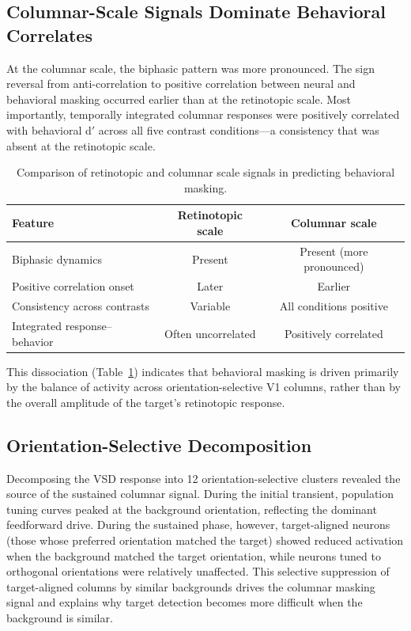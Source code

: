 \documentclass[11pt]{article}
\begin{document}
\subsection{Columnar-Scale Signals Dominate Behavioral Correlates}

At the columnar scale, the biphasic pattern was more pronounced. The sign reversal from anti-correlation to positive correlation between neural and behavioral masking occurred earlier than at the retinotopic scale. Most importantly, temporally integrated columnar responses were positively correlated with behavioral d$'$ across all five contrast conditions---a consistency that was absent at the retinotopic scale.

\begin{table}[ht]
\centering
\caption{Comparison of retinotopic and columnar scale signals in predicting behavioral masking.}
\label{tab:scales}
\begin{tabular}{lcc}
\toprule
Feature & Retinotopic scale & Columnar scale \\
\midrule
Biphasic dynamics & Present & Present (more pronounced) \\
Positive correlation onset & Later & Earlier \\
Consistency across contrasts & Variable & All conditions positive \\
Integrated response--behavior & Often uncorrelated & Positively correlated \\
\bottomrule
\end{tabular}
\end{table}

This dissociation (Table~\ref{tab:scales}) indicates that behavioral masking is driven primarily by the balance of activity across orientation-selective V1 columns, rather than by the overall amplitude of the target's retinotopic response.

\subsection{Orientation-Selective Decomposition}

Decomposing the VSD response into 12 orientation-selective clusters revealed the source of the sustained columnar signal. During the initial transient, population tuning curves peaked at the background orientation, reflecting the dominant feedforward drive. During the sustained phase, however, target-aligned neurons (those whose preferred orientation matched the target) showed reduced activation when the background matched the target orientation, while neurons tuned to orthogonal orientations were relatively unaffected. This selective suppression of target-aligned columns by similar backgrounds drives the columnar masking signal and explains why target detection becomes more difficult when the background is similar.
\end{document}

